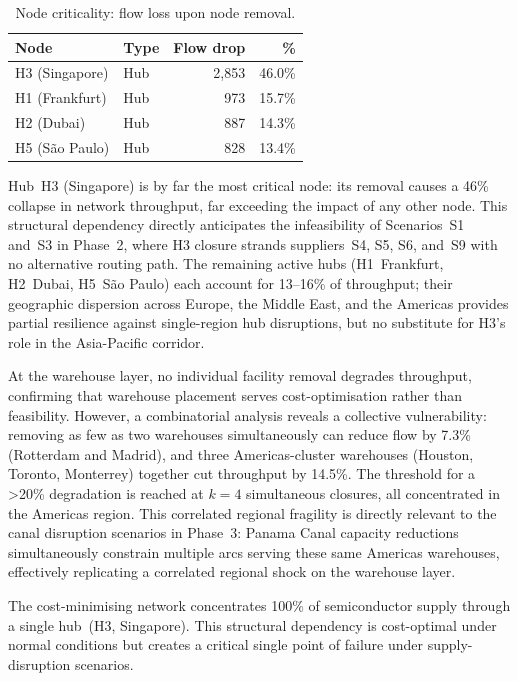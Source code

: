 \begin{table}[H]
\centering
\caption{Node criticality: flow loss upon node removal.}
\label{tab:node_criticality}
\small
\begin{tabular}{llrr}
\toprule
\textbf{Node} & \textbf{Type} & \textbf{Flow drop} & \textbf{\%} \\
\midrule
H3 (Singapore)  & Hub & 2{,}853 & 46.0\% \\
H1 (Frankfurt)  & Hub &   973   & 15.7\% \\
H2 (Dubai)      & Hub &   887   & 14.3\% \\
H5 (São Paulo)  & Hub &   828   & 13.4\% \\
\bottomrule
\end{tabular}
\end{table}

Hub~H3 (Singapore) is by far the most critical node: its removal
causes a 46\% collapse in network throughput, far exceeding the
impact of any other node. This structural dependency directly
anticipates the infeasibility of Scenarios~S1 and~S3 in Phase~2,
where H3 closure strands suppliers~S4, S5, S6, and~S9 with no alternative
routing path. The remaining active hubs (H1~Frankfurt, H2~Dubai,
H5~São Paulo) each account for 13--16\% of throughput; their
geographic dispersion across Europe, the Middle East, and the
Americas provides partial resilience against single-region hub
disruptions, but no substitute for H3's role in the Asia-Pacific
corridor.

At the warehouse layer, no individual facility removal degrades
throughput, confirming that warehouse placement serves
cost-optimisation rather than feasibility. However, a
combinatorial analysis reveals a collective vulnerability: removing
as few as two warehouses simultaneously can reduce flow by 7.3\%
(Rotterdam and Madrid), and three Americas-cluster warehouses
(Houston, Toronto, Monterrey) together cut throughput by 14.5\%.
The threshold for a \textgreater{}20\% degradation is reached at
$k = 4$ simultaneous closures, all concentrated in the Americas
region. This correlated regional fragility is directly relevant to
the canal disruption scenarios in Phase~3: Panama Canal capacity
reductions simultaneously constrain multiple arcs serving these
same Americas warehouses, effectively replicating a correlated
regional shock on the warehouse layer.

\begin{tcolorbox}[notebox, title={Phase~1 key finding}]
\small
The cost-minimising network concentrates 100\% of semiconductor supply
through a single hub~(H3, Singapore).
This structural dependency is cost-optimal under normal conditions but
creates a critical single point of failure under supply-disruption scenarios.
\end{tcolorbox}
